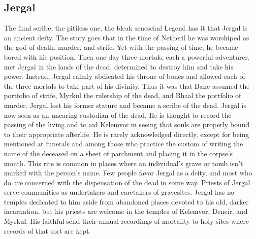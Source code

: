 \documentclass[10pt,a4paper,twoside,twocolumn,openany,bg=print,nodeprecatedcode]{dndbook}
\begin{document}
\subsection{Jergal}
The final scribe, the pitiless one, the bleak seneschal
Legend has it that Jergal is an ancient deity. The story goes that in the time of Netheril he was worshiped as the god of death, murder, and strife. Yet with the passing of time, he became bored with his position. Then one day three mortals, each a powerful adventurer, met Jergal in the lands of the dead, determined to destroy him and take his power. Instead, Jergal calmly abdicated his throne of bones and allowed each of the three mortals to take part of his divinity. Thus it was that Bane assumed the portfolio of strife, Myrkul the rulership of the dead, and Bhaal the portfolio of murder. Jergal lost his former stature and became a scribe of the dead.
Jergal is now seen as an uncaring custodian of the dead. He is thought to record the passing of the living and to aid Kelemvor in seeing that souls are properly bound to their appropriate afterlife. He is rarely acknowledged directly, except for being mentioned at funerals and among those who practice the custom of writing the name of the deceased on a sheet of parchment and placing it in the corpse's mouth. This rite is common in places where an individual's grave or tomb isn't marked with the person's name.
Few people favor Jergal as a deity, and most who do are concerned with the dispensation of the dead in some way. Priests of Jergal serve communities as undertakers and caretakers of gravesites. Jergal has no temples dedicated to him aside from abandoned places devoted to his old, darker incarnation, but his priests are welcome in the temples of Kelemvor, Deneir, and Myrkul. His faithful send their annual recordings of mortality to holy sites where records of that sort are kept.
\end{document}
